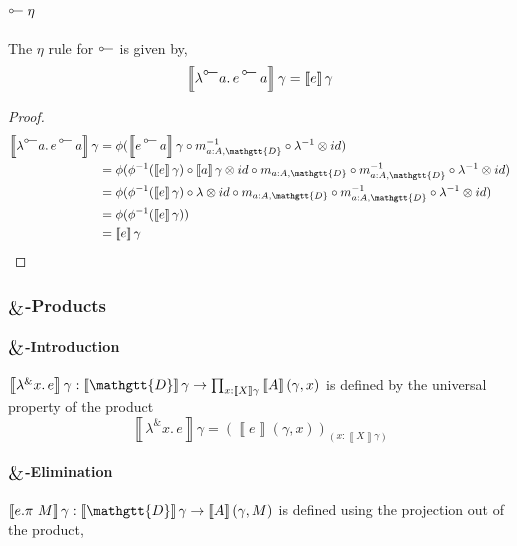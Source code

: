 \documentclass[acmsmall,nonacm]{acmart}
\renewcommand{\Delta}{\mathgtt{D}}
\newcommand{\sem}[1]{\left\llbracket{#1}\right\rrbracket}
\newcommand{\semg}[1]{\sem{#1}\gamma}
\newcommand{\lto}{\multimap}
\newcommand{\tol}{\mathrel{\rotatebox[origin=c]{180}{$\lto$}}}
\DeclareMathOperator*{\bigamp}{\scalerel*{\&}{\bigoplus}}
\newcommand{\lambtol}[2]{\lambda^{{\tol}} #1.\, #2}
\newcommand{\dlamb}[2]{{\lambda}^{{\&}} #1.\, #2}
\newcommand{\apptol}[2]{#1 \mathop{{}^{\tol}} #2}
\begin{document}
\paragraph{$\tol\eta$}
The $\eta$ rule for $\tol$ is given by,
\[
  \semg{\lambtol {a} {\apptol e a}} = \semg{e}
\]
\begin{proof}
\begin{align*}
  \semg{\lambtol {a} {\apptol e a}}
  & = \phi(\semg{\apptol e a} \circ m^{-1}_{a:A,\Delta} \circ \lambda^{-1} \otimes id) \\
  & = \phi(\phi^{-1}(\semg{e}) \circ \semg{a} \otimes id \circ m_{a:A,\Delta} \circ m^{-1}_{a:A,\Delta} \circ \lambda^{-1} \otimes id) \\
  & = \phi(\phi^{-1}(\semg{e}) \circ \lambda \otimes id \circ m_{a:A,\Delta} \circ m^{-1}_{a:A,\Delta} \circ \lambda^{-1} \otimes id) \\
  & = \phi(\phi^{-1}(\semg{e})) \\
  & = \semg{e}
\end{align*}
\end{proof}

\subsubsection{$\bigamp$-Products}
\paragraph{$\bigamp$-Introduction}
$\semg{\dlamb x e} : \semg{\Delta} \to \prod_{x : \semg{X}} {\sem{A}(\gamma , x)}$ is
defined by the universal property of the product
\[
\semg{\dlamb x e} = \left( \sem{e}(\gamma , x) \right)_{(x : \semg{X})}
\]

\paragraph{$\bigamp$-Elimination}
$\semg{e.\pi~M} : \semg{\Delta} \to \sem{A}(\gamma , M)$ is defined using the
projection out of the product,

\begin{center}
\end{center}
\end{document}
